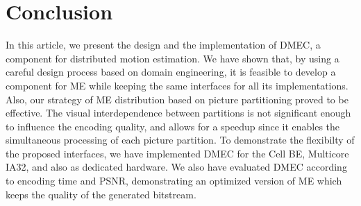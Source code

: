 \section{Conclusion} \label{concl}
% 
In this article, we present the design and the implementation of DMEC, a component
for distributed motion estimation.
We have shown that, by using a careful design process based on domain engineering,
it is feasible to develop a component for ME while keeping the same interfaces for
all its implementations. Also, our strategy of ME distribution based on picture partitioning proved
to be effective. The visual interdependence between partitions is not significant enough to
influence the encoding quality, and allows for a speedup since it enables the simultaneous
processing of each picture partition.
To demonstrate the flexibilty of the proposed interfaces, we have implemented DMEC for the
Cell BE, Multicore IA32, and also as dedicated hardware. We also have evaluated DMEC according to
encoding time and PSNR, demonstrating an optimized version of ME which keeps the quality of the
generated bitstream.








